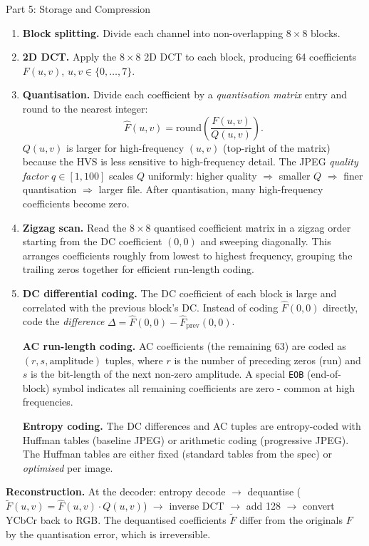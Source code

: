 \documentclass[letterpaper]{article}
\begin{document}
\begin{notes}{Part 5: Storage and Compression}
\begin{enumerate}
    \item \textbf{Block splitting.} Divide each channel into non-overlapping $8\times8$ blocks.
    
    \item \textbf{2D DCT.} Apply the $8\times8$ 2D DCT to each block, producing 64 coefficients $F(u,v)$, $u,v \in \{0,\dots,7\}$.
    
    \item \textbf{Quantisation.} Divide each coefficient by a \emph{quantisation matrix} entry and round to the nearest integer:
    $$\hat{F}(u,v) = \mathrm{round}\!\left(\frac{F(u,v)}{Q(u,v)}\right).$$
    $Q(u,v)$ is larger for high-frequency $(u,v)$ (top-right of the matrix) because the HVS is less sensitive to high-frequency detail. The JPEG \emph{quality factor} $q\in[1,100]$ scales $Q$ uniformly: higher quality $\Rightarrow$ smaller $Q$ $\Rightarrow$ finer quantisation $\Rightarrow$ larger file. After quantisation, many high-frequency coefficients become zero.
    
    \item \textbf{Zigzag scan.} Read the $8\times8$ quantised coefficient matrix in a zigzag order starting from the DC coefficient $(0,0)$ and sweeping diagonally. This arranges coefficients roughly from lowest to highest frequency, grouping the trailing zeros together for efficient run-length coding.
    
    \item \textbf{DC differential coding.} The DC coefficient of each block is large and correlated with the previous block's DC. Instead of coding $\hat{F}(0,0)$ directly, code the \emph{difference} $\Delta = \hat{F}(0,0) - \hat{F}_{\text{prev}}(0,0)$.
    
    \textbf{AC run-length coding.} AC coefficients (the remaining 63) are coded as $(r, s, \text{amplitude})$ tuples, where $r$ is the number of preceding zeros (run) and $s$ is the bit-length of the next non-zero amplitude. A special \texttt{EOB} (end-of-block) symbol indicates all remaining coefficients are zero - common at high frequencies.
    
    \textbf{Entropy coding.} The DC differences and AC tuples are entropy-coded with Huffman tables (baseline JPEG) or arithmetic coding (progressive JPEG). The Huffman tables are either fixed (standard tables from the spec) or \emph{optimised} per image.
\end{enumerate}



\textbf{Reconstruction.} At the decoder: entropy decode $\to$ dequantise ($\tilde{F}(u,v) = \hat{F}(u,v)\cdot Q(u,v)$) $\to$ inverse DCT $\to$ add 128 $\to$ convert YCbCr back to RGB. The dequantised coefficients $\tilde{F}$ differ from the originals $F$ by the quantisation error, which is irreversible.\\


\end{notes}
\end{document}
